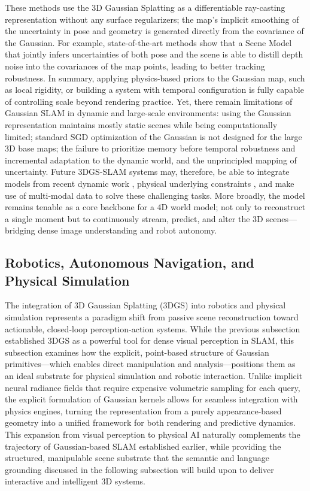 \documentclass[11pt,a4paper]{article}
\begin{document}
These methods use the 3D Gaussian Splatting as a differentiable ray-casting representation without any surface regularizers; the map's implicit smoothing of the uncertainty in pose and geometry is generated directly from the covariance of the Gaussian. For example, state-of-the-art methods show that a Scene Model that jointly infers uncertainties of both pose and the scene is able to distill depth noise into the covariances of the map points, leading to better tracking robustness. In summary, applying physics-based priors to the Gaussian map, such as local rigidity, or building a system with temporal configuration is fully capable of controlling scale beyond rendering practice. Yet, there remain limitations of Gaussian SLAM in dynamic and large-scale environments: using the Gaussian representation maintains mostly static scenes while being computationally limited; standard SGD optimization of the Gaussian is not designed for the large 3D base maps; the failure to prioritize memory before temporal robustness and incremental adaptation to the dynamic world, and the unprincipled mapping of uncertainty. Future 3DGS-SLAM systems may, therefore, be able to integrate models from recent dynamic work \cite{arxiv:2310.08528v2,arxiv:2308.09713v1}, physical underlying constraints \cite{arxiv:2403.08498v1,arxiv:2401.15318v1}, and make use of multi-modal data \cite{arxiv:2312.06741v2} to solve these challenging tasks. More broadly, the model remains tenable as a core backbone for a 4D world model; not only to reconstruct a single moment but to continuously stream, predict, and alter the 3D scenes---bridging dense image understanding and robot autonomy.


\subsection{Robotics, Autonomous Navigation, and Physical Simulation}


The integration of 3D Gaussian Splatting (3DGS) into robotics and physical simulation represents a paradigm shift from passive scene reconstruction toward actionable, closed-loop perception-action systems. While the previous subsection established 3DGS as a powerful tool for dense visual perception in SLAM, this subsection examines how the explicit, point-based structure of Gaussian primitives---which enables direct manipulation and analysis---positions them as an ideal substrate for physical simulation and robotic interaction. Unlike implicit neural radiance fields that require expensive volumetric sampling for each query, the explicit formulation of Gaussian kernels allows for seamless integration with physics engines, turning the representation from a purely appearance-based geometry into a unified framework for both rendering and predictive dynamics. This expansion from visual perception to physical AI naturally complements the trajectory of Gaussian-based SLAM established earlier, while providing the structured, manipulable scene substrate that the semantic and language grounding discussed in the following subsection will build upon to deliver interactive and intelligent 3D systems.
\end{document}
